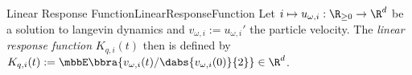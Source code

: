 \begin{mdef}{Linear Response Function}{LinearResponseFunction}
    Let $i\mapsto {u_{\omega,i}}:\R_{\geq 0}\to\R^d$ be a solution to langevin dynamics and $v_{\omega,i}:={u_{\omega,i}}'$ the particle velocity. The \emph{linear response function} $K_{q,i}(t)$ then is defined by $K_{q,i}(t) := \mbbE\bbra{v_{\omega,i}(t)/\dabs{v_{\omega,i}(0)}{2}}\in\R^d$.
\end{mdef}